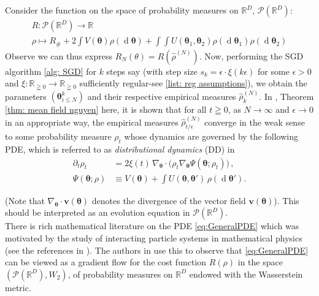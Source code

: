 \documentclass{article}
\theoremstyle{mystyle}
\newcommand{\R}{\ensuremath{\mathbb{R}}}
\newcommand{\diff}{\ensuremath{\operatorname{d}\!}}
\begin{document}
Consider the function on the space of probability measures on $ \R^{D}$, $  \mathcal{P}(\R^{D})$:
\[
\begin{array}{cc}
    R: \mathcal{P}(\R^{D})\to \R \\ 
    \rho \mapsto R_{\#}+ 2 \displaystyle\int V( \mathbf{\theta}) \rho( \diff \mathbf{\theta}) + \displaystyle \int\int U( \mathbf{\theta}_{1}, \mathbf{\theta}_{2}) \rho( \diff \mathbf{\theta}_{1}) \rho( \diff \mathbf{\theta}_{2})   
\end{array}
\]
Observe we can thus express $ R_{N}(\mathbb{\theta}) = R(\hat{\rho}^{(N)})$. Now, performing the SGD algorithm \ref{alg: SGD} for $ k$ steps say (with step size $ s_k = \epsilon\cdot \xi(k \epsilon)$ for some $ \epsilon >0$ and $ \xi: \R_{\geqq 0}\to \R_{\geqq 0}$ sufficiently regular-see \ref{list: reg assumptions}), we obtain the parameters $  (\mathbf{\theta}^{k}_{i\leq N})$ and their respective empirical measures $ \hat{\rho}^{(N)}_k$. In \cite{Mei_2018}, Theorem \ref{thm: mean field nguyen} here, it is shown that for all $ t\geqq 0$, as $ N\to \infty$ and $ \epsilon \to 0$ in an appropriate way, the empirical measures $ \hat{\rho}^{(N)}_{t/\epsilon}$ converge in the weak sense to some probability measure $ \rho_t$ whose dynamics are governed by the following PDE, which is referred to as \emph{distributional dynamics} (DD) in \cite{Mei_2018}
\begin{equation}
	\begin{array}{ll}
\partial_t \rho_t & =2\xi(t)\, \nabla_{ \mathbf{\theta}}\cdot \Big(\rho_t \nabla_{ \mathbf{\theta}}\Psi( \mathbf{\theta};\rho_t)\Big)\, ,\label{eq:GeneralPDE}\\
\Psi( \mathbf{\theta};\rho) & \equiv V( \mathbf{ \theta})+\int U( \mathbf{\theta}, \mathbf{\theta}')\, \rho(\diff  \mathbf{\theta}') .
\end{array}
\end{equation}

(Note that $\nabla_{ \mathbf{\theta}}\cdot \mathbf{v}( \mathbf{\theta})$ denotes the divergence of the vector field $ \mathbf{v}( \mathbf{\theta})$). This should  be interpreted as an evolution equation in $ \mathcal{P}(\R^D)$.\\

There is rich mathematical literature on the PDE \ref{eq:GeneralPDE} which was
motivated by the study of interacting particle systems in mathematical physics (see the references in \cite{Mei_2018}). The authors in \cite{Mei_2018} use this to observe that \ref{eq:GeneralPDE} can be viewed as a gradient flow for the cost function $R(\rho)$ in the space 
$( \mathcal{P}(\R^D),W_2)$, of probability measures on $\R^D$
endowed with the Wasserstein metric.\\
\end{document}
